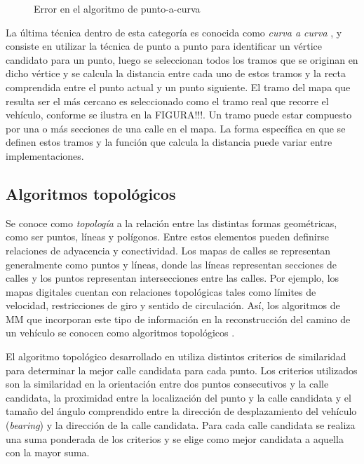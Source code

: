 \begin{figure}[h]
	\centering
	
	\caption{Error en el algoritmo de punto-a-curva}
	\label{fig:punto-a-curva} 
\end{figure}

La última técnica dentro de esta categoría es conocida como \emph{curva a curva} \cite{white2000some}, y consiste en  utilizar la técnica de punto a punto para identificar un vértice candidato para un punto, luego se seleccionan todos los tramos que se originan en dicho vértice y se calcula la distancia entre cada uno de estos tramos y la recta comprendida entre el punto actual y un punto siguiente. El tramo del mapa que resulta ser el más cercano es seleccionado como el tramo real que recorre el vehículo, conforme se ilustra en la FIGURA!!!. Un tramo puede estar compuesto por una o más secciones de una calle en el mapa. La forma específica en que se definen estos tramos y la función que calcula la distancia puede variar entre implementaciones.

\subsection{Algoritmos topológicos}

Se conoce como \emph{topología} a la relación entre las distintas formas geométricas, como ser puntos, líneas y polígonos. Entre estos elementos pueden definirse relaciones de adyacencia y conectividad. Los mapas de calles se representan generalmente como puntos y líneas, donde las líneas representan secciones de calles y los puntos representan intersecciones entre las calles. Por ejemplo, los mapas digitales cuentan con relaciones topológicas tales como límites de velocidad, restricciones de giro y sentido de circulación. Así, los algoritmos de MM que incorporan este tipo de información en la reconstrucción del camino de un vehículo se conocen como algoritmos topológicos \cite{quddus2007current}.

El algoritmo topológico desarrollado en \cite{greenfeld2002matching} utiliza distintos criterios de similaridad para determinar la mejor calle candidata para cada punto. Los criterios utilizados son la similaridad en la orientación entre dos puntos consecutivos y la calle candidata, la proximidad entre la localización del punto y la calle candidata y el tamaño del ángulo comprendido entre la dirección de desplazamiento del vehículo (\emph{bearing}) y la dirección de la calle candidata. Para cada calle candidata se realiza una suma ponderada de los criterios y se elige como mejor candidata a aquella con la mayor suma.

